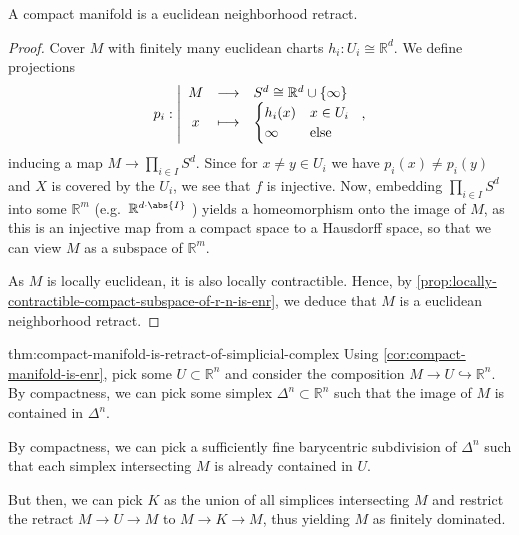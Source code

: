 \begin{corollary}
  \label{cor:compact-manifold-is-enr}
  A compact manifold is a euclidean neighborhood retract.
\end{corollary}

\begin{proof}
  Cover $M$ with finitely many euclidean charts  $h_i\colon U_i \cong \mathbb{R}^d$.
  We define projections
    \begin{equation*}
    p_i: \left| \begin{array}{c c l} 
    M & \longrightarrow & S^d \cong \mathbb{R}^d \cup \left\{\infty\right\}  \\
    x & \longmapsto &  \begin{cases}
      h_i(x) & x \in U_i \\
      \infty& \text{else}
    \end{cases}
    \end{array} \right.
    ,
  \end{equation*}
  inducing a map $M \to \prod_{i \in I} S^d$.
  Since for $x\neq y\in U_i$ we have $p_i(x) \neq p_i(y)$ and
  $X$ is covered by the  $U_i$, we see that $f$ is injective.
  Now, embedding $\prod _{i \in I} S^d$ into some $\mathbb{R}^{m}$
  (e.g.~$\mathbb{R}^{d\cdot \abs{I} }$ )
  yields a homeomorphism onto the image of $M$,
  as this is an injective map from a compact space to a Hausdorff
  space,
  so that we can view $M$ as a subspace of  $\mathbb{R}^m$.

  As $M$ is locally euclidean, it is also locally contractible.
  Hence, by
  \autoref{prop:locally-contractible-compact-subspace-of-r-n-is-enr},
  we deduce that $M$ is a euclidean neighborhood retract.
\end{proof}

\begin{refproof}{thm:compact-manifold-is-retract-of-simplicial-complex}
  Using
  \autoref{cor:compact-manifold-is-enr},
  pick some $U\subset \mathbb{R}^n$ and consider the composition
  $M \to U \hookrightarrow \mathbb{R}^n$.
  By compactness, we can pick some simplex $\Delta^n \subset \mathbb{R}^n$
  such that the image of $M$ is contained in  $\Delta^n$.

  By compactness, we can pick a sufficiently fine barycentric subdivision
  of $\Delta^n$ such that each simplex intersecting $M$ is already contained
  in  $U$.

  But then, we can pick  $K$ as the union of all simplices intersecting $M$ 
  and restrict the retract $M \to U \to M$ to $M \to K \to M$, thus
  yielding $M$ as finitely dominated.
\end{refproof}





